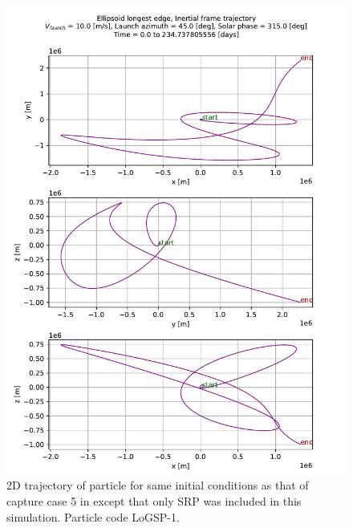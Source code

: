 \begin{figure}[htb]
\centering
\captionsetup{justification=centering}
\includegraphics[width=\linewidth, height=\textheight, keepaspectratio=true]{longest_edge_perturbations/3.2Density_1cmSize/10ms_45Azimuth_315SolarPhase/noSTBE_2d_trajectory_inertialFrame.pdf}
\caption{2D trajectory of particle for same initial conditions as that of capture case 5 in  except that only \gls{SRP} was included in this simulation. Particle code LoGSP-1.}
\label{fig:LoGSP_1_capture_case_5_2d_inertialTrajectory_noSTBE}
\end{figure}
\FloatBarrier
